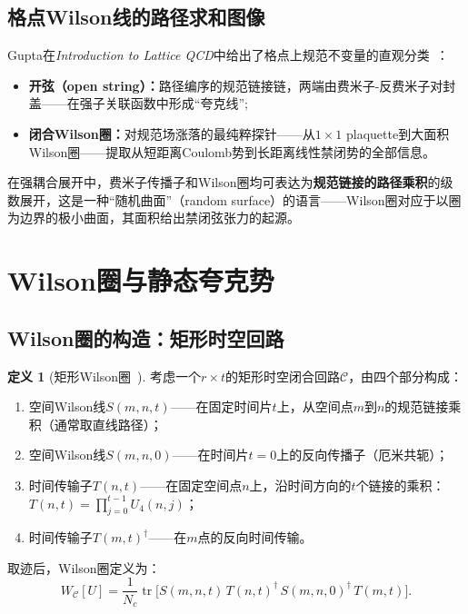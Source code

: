 \documentclass[12pt,a4paper]{ctexart}
\theoremstyle{definition}
\newtheorem{definition}{定义}[section]
\begin{document}
\subsection{格点Wilson线的路径求和图像}

Gupta在\textit{Introduction to Lattice QCD}中给出了格点上规范不变量的直观分类~\cite{Gupta1997intro}：
\begin{itemize}
    \item \textbf{开弦（open string）：}路径编序的规范链接链，两端由费米子-反费米子对封盖——在强子关联函数中形成``夸克线'';
    \item \textbf{闭合Wilson圈：}对规范场涨落的最纯粹探针——从$1\times 1$ plaquette到大面积Wilson圈——提取从短距离Coulomb势到长距离线性禁闭势的全部信息。
\end{itemize}

在强耦合展开中，费米子传播子和Wilson圈均可表达为\textbf{规范链接的路径乘积}的级数展开，这是一种``随机曲面''（random surface）的语言——Wilson圈对应于以圈为边界的极小曲面，其面积给出禁闭弦张力的起源。

\section{Wilson圈与静态夸克势}

\subsection{Wilson圈的构造：矩形时空回路}

\begin{definition}[矩形Wilson圈~\cite{GattringerLang2010}]
考虑一个$r \times t$的矩形时空闭合回路$\mathcal{C}$，由四个部分构成：
\begin{enumerate}[nosep]
    \item 空间Wilson线$S(m, n, t)$——在固定时间片$t$上，从空间点$m$到$n$的规范链接乘积（通常取直线路径）；
    \item 空间Wilson线$S(m, n, 0)$——在时间片$t=0$上的反向传播子（厄米共轭）；
    \item 时间传输子$T(n, t)$——在固定空间点$n$上，沿时间方向的$t$个链接的乘积：$T(n, t) = \prod_{j=0}^{t-1} U_4(n, j)$；
    \item 时间传输子$T(m, t)^\dagger$——在$m$点的反向时间传输。
\end{enumerate}
取迹后，Wilson圈定义为：
\begin{equation}
W_{\mathcal{C}}[U] = \frac{1}{N_c}\operatorname{tr}\!\big[S(m,n,t)\, T(n,t)^\dagger\, S(m,n,0)^\dagger\, T(m,t)\big].
\label{eq:wilson_loop_rectangle}
\end{equation}
\end{definition}
\end{document}
